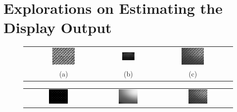 \documentclass{report}
\begin{document}
\section{Explorations on Estimating the Display Output}

\begin{figure}
\centering
\begin{tabular}{ccc}
\includegraphics[width=0.3\textwidth]{images/display-pattern.png}&
\includegraphics[width=0.3\textwidth]{images/display-photo.png}&
\includegraphics[width=0.3\textwidth]{images/rendered.png}\\
(a) & (b) & (c)
\end{tabular}
\begin{tabular}{ccc}
\includegraphics[width=0.3\textwidth]{images/rendered-sample.png}&
\includegraphics[width=0.3\textwidth]{images/fitted-gray.png}&
\includegraphics[width=0.3\textwidth]{images/fitted-image.png}\\

\end{tabular}
\end{figure}
\end{document}
